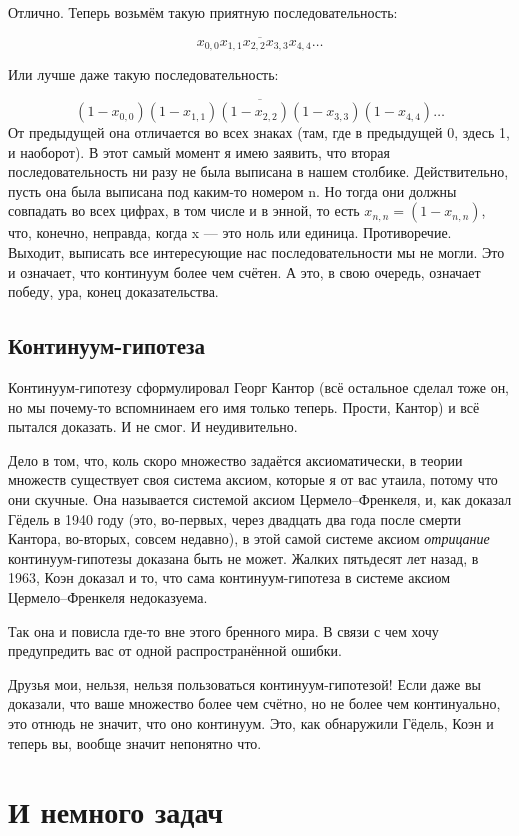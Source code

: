 \documentclass[12pt, onecolumn]{report}
\begin{document}
Отлично. Теперь возьмём такую приятную последовательность: 

$$\overline{x_{0,0} x_{1,1} x_{2,2} x_{3,3} x_{4,4} \ldots}$$

Или лучше даже такую последовательность:

$$\overline{(1-x_{0,0})(1-x_{1,1})(1-x_{2,2})(1-x_{3,3})(1-x_{4,4}) \ldots}$$
От предыдущей она отличается во всех знаках (там, где в предыдущей 0, здесь 1, и наоборот). В этот самый момент я имею заявить, что вторая последовательность ни разу не была выписана в нашем столбике. Действительно, пусть она была выписана под каким-то номером n. Но тогда они должны совпадать во всех цифрах, в том числе и в энной, то есть $x_{n,n} = (1-x_{n,n})$, что, конечно, неправда, когда x --- это ноль или единица. Противоречие. Выходит, выписать все интересующие нас последовательности мы не могли. Это и означает, что континуум более чем счётен. А это, в свою очередь, означает победу, ура, конец доказательства.

\section{Континуум-гипотеза}
Континуум-гипотезу сформулировал Георг Кантор (всё остальное сделал тоже он, но мы почему-то вспомнинаем его имя только теперь. Прости, Кантор) и всё пытался доказать. И не смог. И неудивительно.

Дело в том, что, коль скоро множество задаётся аксиоматически, в теории множеств существует своя система аксиом, которые я от вас утаила, потому что они скучные. Она называется системой аксиом Цермело--Френкеля, и, как доказал Гёдель в 1940 году (это, во-первых, через двадцать два года после смерти Кантора, во-вторых, совсем недавно), в этой самой системе аксиом {\itshape отрицание} континуум-гипотезы доказана быть не может. Жалких пятьдесят лет назад, в 1963, Коэн доказал и то, что сама континуум-гипотеза в системе аксиом Цермело--Френкеля недоказуема.

Так она и повисла где-то вне этого бренного мира. В связи с чем хочу предупредить вас от одной распространённой ошибки.

Друзья мои, нельзя, нельзя пользоваться континуум-гипотезой! Если даже вы доказали, что ваше множество более чем счётно, но не более чем континуально, это отнюдь не значит, что оно континуум. Это, как обнаружили Гёдель, Коэн и теперь вы, вообще значит непонятно что.

\chapter*{И немного задач}
\end{document}
